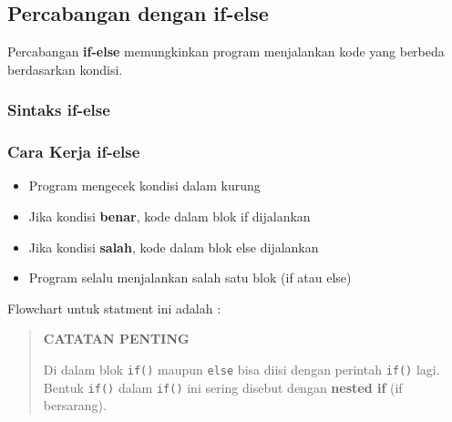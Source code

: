 \subsection{Percabangan dengan if-else}\label{percabangan-dengan-if-..-else}

Percabangan \textbf{if-else} memungkinkan program menjalankan kode yang berbeda berdasarkan kondisi.

\subsubsection{Sintaks if-else}



\subsubsection{Cara Kerja if-else}

\begin{itemize}
\item Program mengecek kondisi dalam kurung
\item Jika kondisi \textbf{benar}, kode dalam blok if dijalankan
\item Jika kondisi \textbf{salah}, kode dalam blok else dijalankan
\item Program selalu menjalankan salah satu blok (if atau else)
\end{itemize}

Flowchart untuk statment ini adalah :

\begin{quotation}
{\LARGE {}} \textbf{CATATAN PENTING}

Di dalam blok \texttt{if()} maupun \texttt{else} bisa diisi dengan perintah \texttt{if()} lagi. Bentuk \texttt{if()} dalam \texttt{if()} ini sering disebut dengan \textbf{nested if} (if bersarang).
\end{quotation}


